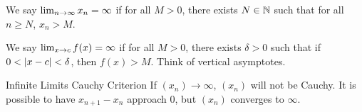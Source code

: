 We say \(\lim_{n \rightarrow \infty} x_n = \infty\) if for all \(M > 0\), there exists \(N \in \mathbb{N}\) such that for all \(n \geq N\), \(x_n > M\).

We say \(\lim_{x \rightarrow c}f(x) = \infty\) if for all \(M > 0\), there exists \(\delta > 0\) such that if \(0 < \left|x - c\right| < \delta\), then \(f(x) > M\). Think of vertical asymptotes.


\begin{ntheorem}
    {Infinite Limits Cauchy Criterion} If \((x_n) \rightarrow \infty\), \((x_n)\) will not be Cauchy. It is possible to have \(x_{n+1} - x_n\) approach 0, but \((x_n)\) converges to \(\infty\).
\end{ntheorem}







